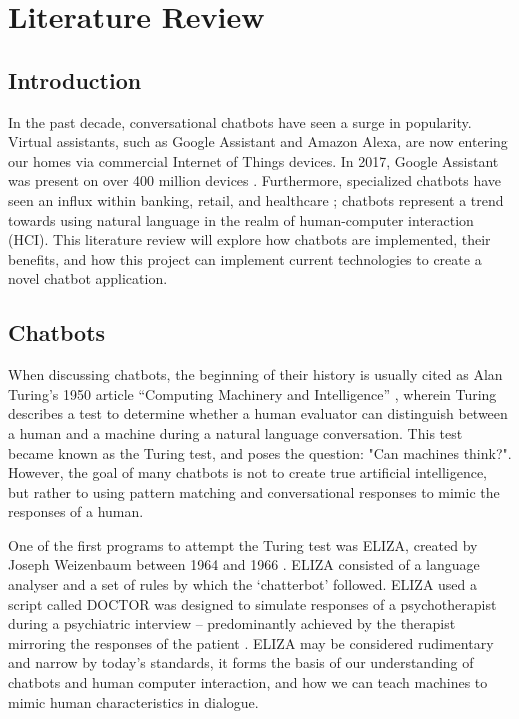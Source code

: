 \chapter{Literature Review}
\section{Introduction}
In the past decade, conversational chatbots have seen a surge in popularity. Virtual assistants, such as Google Assistant and Amazon Alexa, are now entering our homes via commercial Internet of Things devices. In 2017, Google Assistant was present on over 400 million devices \cite{chandra2018}. Furthermore, specialized chatbots have seen an influx within banking, retail, and healthcare \cite{gvr2017}; chatbots represent a trend towards using natural language in the realm of human-computer interaction (HCI).  This literature review will explore how chatbots are implemented, their benefits, and how this project can implement current technologies to create a novel chatbot application.

\section{Chatbots}
When discussing chatbots, the beginning of their history is usually cited as Alan Turing’s 1950 article “Computing Machinery and Intelligence” \cite{turing1950computing}, wherein Turing describes a test to determine whether a human evaluator can distinguish between a human and a machine during a natural language conversation. This test became known as the Turing test, and poses the question: "Can machines think?". However, the goal of many chatbots is not to create true artificial intelligence, but rather to using pattern matching and conversational responses to mimic the responses of a human.

One of the first programs to attempt the Turing test was ELIZA, created by Joseph Weizenbaum between 1964 and 1966 \cite{weizenbaum1976computer}. ELIZA consisted of a language analyser and a set of rules by which the ‘chatterbot’ followed. ELIZA used a script called DOCTOR was designed to simulate responses of a psychotherapist during a psychiatric interview – predominantly achieved by the therapist mirroring the responses of the patient  \cite{weizenbaum1976computer}. ELIZA may be considered rudimentary and narrow by today’s standards, it forms the basis of our understanding of chatbots and human computer interaction, and how we can teach machines to mimic human characteristics in dialogue.

